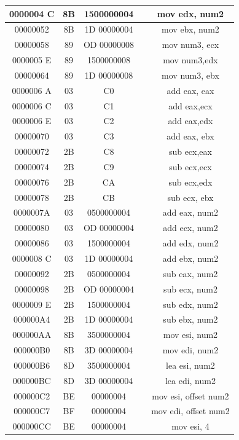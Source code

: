 \documentclass[10pt]{book}
\begin{document}
\begin{center}
\begin{center}
\begin{center}
\begin{center}
\begin{center}
\begin{center}
\begin{tabular}{|c|c|c|c|c|}
\hline
0000004 C & 8B & 1500000004 &  & mov edx, num2 \\
\hline
00000052 & 8B & 1D 00000004 &  & mov ebx, num2 \\
\hline
00000058 & 89 & OD 00000008 &  & mov num3, ecx \\
\hline
0000005 E & 89 & 1500000008 &  & mov num3,edx \\
\hline
00000064 & 89 & 1D 00000008 &  & mov num3, ebx \\
\hline
0000006 A & 03 & C0 &  & add eax, eax \\
\hline
0000006 C & 03 & C1 &  & add eax,ecx \\
\hline
0000006 E & 03 & C2 &  & add eax,edx \\
\hline
00000070 & 03 & C3 &  & add eax, ebx \\
\hline
00000072 & 2B & C8 &  & sub ecx,eax \\
\hline
00000074 & 2B & C9 &  & sub ecx,ecx \\
\hline
00000076 & 2B & CA &  & sub ecx,edx \\
\hline
00000078 & 2B & CB &  & sub ecx, ebx \\
\hline
0000007A & 03 & 0500000004 &  & add eax, num2 \\
\hline
00000080 & 03 & OD 00000004 &  & add ecx, num2 \\
\hline
00000086 & 03 & 1500000004 &  & add edx, num2 \\
\hline
0000008 C & 03 & 1D 00000004 &  & add ebx, num2 \\
\hline
00000092 & 2B & 0500000004 &  & sub eax, num2 \\
\hline
00000098 & 2B & OD 00000004 &  & sub ecx, num2 \\
\hline
0000009 E & 2B & 1500000004 &  & sub edx, num2 \\
\hline
000000A4 & 2B & 1D 00000004 &  & sub ebx, num2 \\
\hline
000000AA & 8B & 3500000004 &  & mov esi, num2 \\
\hline
000000B0 & 8B & 3D 00000004 &  & mov edi, num2 \\
\hline
000000B6 & 8D & 3500000004 &  & lea esi, num2 \\
\hline
000000BC & 8D & 3D 00000004 &  & lea edi, num2 \\
\hline
000000C2 & BE & 00000004 &  & mov esi, offset num2 \\
\hline
000000C7 & BF & 00000004 &  & mov edi, offset num2 \\
\hline
000000CC & BE & 00000004 &  & mov esi, 4 \\

\end{tabular}
\end{center}
\end{center}
\end{center}
\end{center}
\end{center}
\end{center}
\end{document}

